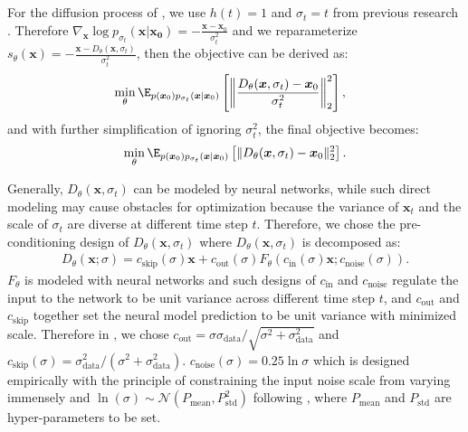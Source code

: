\subsection{\modelname}

For the diffusion process of \modelname, we use $h(t)=1$ and $\sigma_t=t$ from previous research \citep{Karras2022edm}.
Therefore $\nabla_{\boldsymbol{x}}\log p_{\sigma_t}(\boldsymbol{x}|\boldsymbol{x_0}) = -\frac{\boldsymbol{x}-\boldsymbol{x}_0}{\sigma_t^2}$ and we reparameterize $s_\theta(\boldsymbol{x})=-\frac{\boldsymbol{x}-D_\theta(\boldsymbol{x},\sigma_t)}{\sigma_t^2}$, then the objective can be derived as:
\begin{align}
    &\min_\theta \E_{p(\boldsymbol{x}_0)p_{\sigma_t}(\boldsymbol{x}|\boldsymbol{x}_0)}\left[\left\|\frac{D_\theta(\boldsymbol{x},\sigma_t)-\boldsymbol{x}_0}{\sigma_t^2}\right\|^2_2\right],
\end{align}
and with further simplification of ignoring ${\sigma_t^2}$, the final objective becomes:
\begin{align} 
    \min_\theta \E_{p(\boldsymbol{x}_0)p_{\sigma_t}(\boldsymbol{x}|\boldsymbol{x}_0)}\left[\|D_\theta(\boldsymbol{x},\sigma_t)-\boldsymbol{x}_0\|^2_2\right]. \label{objective1}
\end{align}

Generally, $D_\theta(\boldsymbol{x},\sigma_t)$ can be modeled by neural networks, while such direct modeling may cause obstacles for optimization because the variance of $\boldsymbol{x}_t$ and the scale of $\sigma_t$ are diverse at different time step $t$. Therefore, we chose the pre-conditioning design of $D_\theta(\boldsymbol{x},\sigma_t)$ \citep{Karras2022edm} where $D_\theta(\boldsymbol{x},\sigma_t)$ is decomposed as:
\begin{align}
D_{\theta}(\boldsymbol{x};\sigma)=c_{\text{skip}}(\sigma)\boldsymbol{x}+c_{\text{out}}(\sigma)F_{\theta}(c_{\text{in}}(\sigma)\boldsymbol{x};c_{\text{noise}}(\sigma)).
\label{precond}
\end{align}
$F_{\theta}$ is modeled with neural networks and such designs of $c_{\text{in}}$ and $c_{\text{noise}}$ regulate the input to the network to be unit variance across different time step $t$, and $c_{\text{out}}$ and $c_{\text{skip}}$ together set the neural model prediction to be unit variance with minimized scale.
Therefore in \modelname, we chose $c_{\text{out}}=\sigma\sigma_{\text{data}}/\sqrt{\sigma^2+\sigma_{\text{data}}^2}$ and $c_{\text{skip}}(\sigma)=\sigma_{\text{data}}^2/(\sigma^2+\sigma_{\text{data}}^2)$. $c_{\text{noise}}(\sigma) = 0.25\ln{\sigma}$ which is designed empirically with the principle of constraining the input noise scale from varying immensely and $\ln(\sigma)\sim \mathcal{N}(P_{\text{mean}}, P_{\text{std}}^2)$ following \cite{Karras2022edm}, where $P_{\text{mean}}$ and $P_{\text{std}}$ are hyper-parameters to be set.

